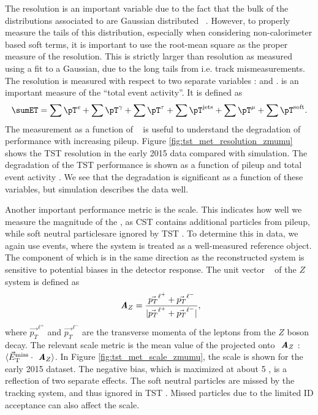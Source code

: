 The \met resolution is an important variable due to the fact that the bulk of the distributions associated to  are Gaussian distributed ~\cite{Aad2012}.
However, to properly measure the tails of this distribution, especially when considering non-calorimeter based soft terms, it is important to use the root-mean square as the proper measure of the resolution.
This is strictly larger than resolution as measured using a fit to a Gaussian, due to the long tails from i.e. track mismeasurements.
The resolution is measured with respect to two separate variables : \sumET and \npv.
\sumET is an important measure of the ``total event activity''.
It is defined as
\begin{equation}
  \sumET =
  \sum \pT^{\text{\textit{e}}}       +
  \sum \pT^{\mathrm{\gamma}}   +
  \sum \pT^{\mathrm{\tau}}        +
  \sum \pT^{\text{jets}}      +
  \sum \pT^{\mathrm{\mu}}     +
  \sum \pT^{\text{soft}}.
 \label{eq:sumet}
\end{equation}
The measurement as a function of \npv~ is useful to understand the degradation of \met performance with increasing pileup.
Figure \ref{fig:tst_met_resolution_zmumu} shows the TST \met resolution in the early 2015 data compared with simulation.
The degradation of the TST \met performance is shown as a function of pileup \npv and total event activity \sumET.
We see that the degradation is significant as a function of these variables, but simulation describes the data well.

Another important performance metric is the \met scale.
This indicates how well we measure the magnitude of the \met, as CST \met contains additional particles from pileup, while soft neutral particles\footnotemark are ignored by TST \met.
To determine this in data, we again use \Zmm events, where the \Zmm system is treated as a well-measured reference object.
The component of \met which is in the same direction as the reconstructed \Zmm system is sensitive to potential biases in the detector response.
The unit vector \Az~ of the $Z$ system is defined as
\begin{equation}
\mathbf { \textbf{ \textit {A}}}_Z =\frac{\vec{p_T}^{\ell^+}+\vec{p_T}^{\ell^-}}{|\vec{p_T}^{\ell^+}+\vec{p_T}^{\ell^-}|},
\end{equation}
where $\vec{p_T}^{\ell^+}$ and $\vec{p_T}^{\ell^-}$ are the transverse momenta of the leptons from the $Z$ boson decay.
The relevant scale metric is the mean value of the \metvec projected onto $\mathbf { \textbf{ \textit {A}}}_Z$ :  $\langle\vec{E}_{\mathrm{T}}^{\mathrm{miss}}\cdot \mathbf { \textbf{ \textit {A}}}_Z \rangle$.
In Figure \ref{fig:tst_met_scale_zmumu}, the scale is shown for the early 2015 dataset.
The negative bias, which is maximized at about 5 \GeV, is a reflection of two separate effects.
The soft neutral particles are missed by the tracking system, and thus ignored in TST \met.
Missed particles due to the limited ID acceptance can also affect the scale.


